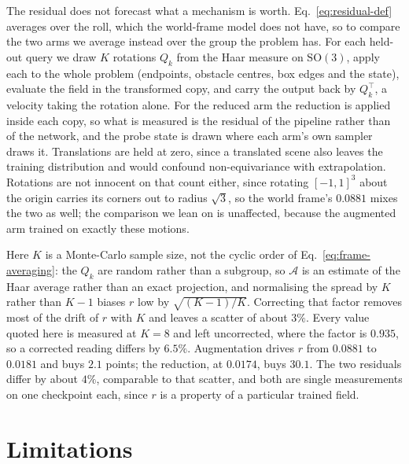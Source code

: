 \documentclass[conference]{IEEEtran}
\begin{document}
The residual does not forecast what a mechanism is worth.
Eq.~\eqref{eq:residual-def} averages over the roll, which the world-frame model
does not have, so to compare the two arms we average instead over the group the
problem has. For each held-out query we draw $K$ rotations $Q_k$ from the Haar
measure on $\mathrm{SO}(3)$, apply each to the whole problem (endpoints,
obstacle centres, box edges and the state), evaluate the field in the
transformed copy, and carry the output back by $Q_k^{\top}$, a velocity taking
the rotation alone. For the reduced arm the reduction is applied inside each
copy, so what is measured is the residual of the pipeline rather than of the
network, and the probe state is drawn where each arm's own sampler draws it.
Translations are held at zero, since a translated scene also leaves the training
distribution and would confound non-equivariance with extrapolation. Rotations
are not innocent on that count either, since rotating $[-1,1]^3$ about the
origin carries its corners out to radius $\sqrt{3}$, so the world frame's
$0.0881$ mixes the two as well; the comparison we lean on is unaffected,
because the augmented arm trained on exactly these motions.

Here $K$ is a Monte-Carlo sample size, not the cyclic order of
Eq.~\eqref{eq:frame-averaging}: the $Q_k$ are random rather than a subgroup, so
$\mathcal{A}$ is an estimate of the Haar average rather than an exact
projection, and normalising the spread by $K$ rather than $K-1$ biases $r$ low
by $\sqrt{(K-1)/K}$. Correcting that factor removes most of the drift of $r$
with $K$ and leaves a scatter of about $3\%$. Every value quoted here is
measured at $K=8$ and left uncorrected, where the factor is $0.935$, so a
corrected reading differs by $6.5\%$. Augmentation drives $r$ from $0.0881$ to
$0.0181$ and buys $2.1$ points; the reduction, at $0.0174$, buys $30.1$. The
two residuals differ by about $4\%$, comparable to that scatter, and both are
single measurements on one checkpoint each, since $r$ is a property of a
particular trained field.

\section{Limitations}
\end{document}
